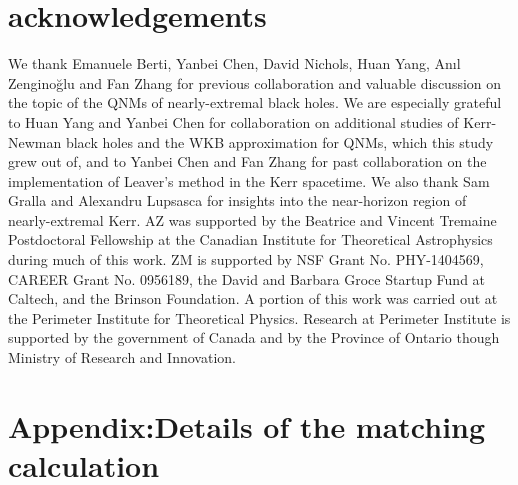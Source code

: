\begin{refsection}
\section{acknowledgements}

We thank Emanuele Berti, Yanbei Chen, David Nichols, Huan Yang, An{\i}l Zengino\u{g}lu and Fan Zhang for previous collaboration and valuable discussion on the topic of the QNMs of nearly-extremal black holes. 
We are especially grateful to Huan Yang and Yanbei Chen for collaboration on additional studies of Kerr-Newman black holes and the WKB approximation for QNMs, which this study grew out of, and to Yanbei Chen and Fan Zhang for past collaboration on the implementation of Leaver's method in the Kerr spacetime. 
We also thank Sam Gralla and Alexandru Lupsasca for insights into the near-horizon region of nearly-extremal Kerr. 
AZ was supported by the Beatrice and Vincent Tremaine Postdoctoral Fellowship at the Canadian Institute for Theoretical Astrophysics during much of this work. 
ZM is supported by NSF Grant No. PHY-1404569,
CAREER Grant No. 0956189, the David and Barbara Groce Startup Fund at Caltech, and the Brinson Foundation. 
A portion of this work was carried out at the Perimeter Institute for Theoretical Physics. 
Research at Perimeter Institute is supported by the government of Canada and by the Province of Ontario though Ministry of Research and Innovation.

\section{Appendix:Details of the matching calculation}
\label{sec:MatchingApp}


\end{refsection}
